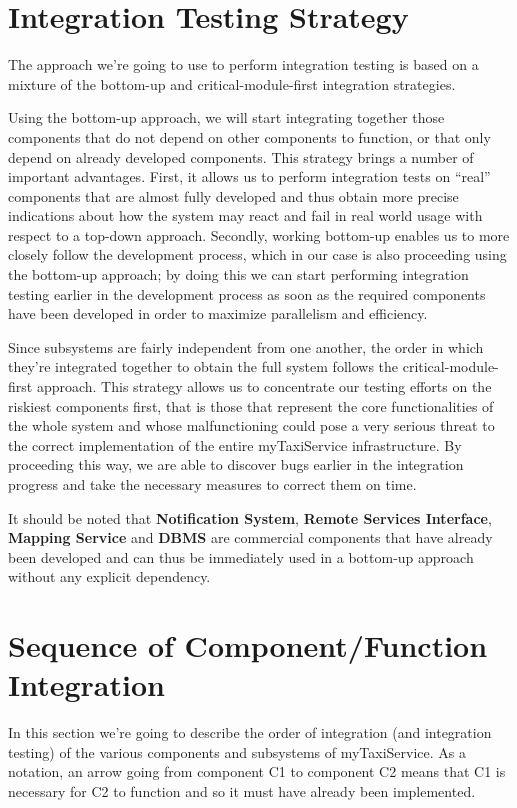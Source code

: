 \section{Integration Testing Strategy}
The approach we're going to use to perform integration testing is based on a mixture of the bottom-up and critical-module-first integration strategies.

Using the bottom-up approach, we will start integrating together those components that do not depend on other components to function, or that only depend on already developed components. This strategy brings a number of important advantages. First, it allows us to perform integration tests on “real” components that are almost fully developed and thus obtain more precise indications about how the system may react and fail in real world usage with respect to a top-down approach. Secondly, working bottom-up enables us to more closely follow the development process, which in our case is also proceeding using the bottom-up approach; by doing this we can start performing integration testing earlier in the development process as soon as the required components have been developed in order to maximize parallelism and efficiency.

Since subsystems are fairly independent from one another, the order in which they're integrated together to obtain the full system follows the critical-module-first approach. This strategy allows us to concentrate our testing efforts on the riskiest components first, that is those that represent the core functionalities of the whole system and whose malfunctioning could pose a very serious threat to the correct implementation of the entire myTaxiService infrastructure. By proceeding this way, we are able to discover bugs earlier in the integration progress and take the necessary measures to correct them on time.

It should be noted that \textbf{Notification System}, \textbf{Remote Services Interface}, \textbf{Mapping Service} and \textbf{DBMS} are commercial components that have already been developed and can thus be immediately used in a bottom-up approach without any explicit dependency. 
\section{Sequence of Component/Function Integration}
In this section we're going to describe the order of integration (and integration testing) of the various components and subsystems of myTaxiService. As a notation, an arrow going from component C1 to component C2 means that C1 is necessary for C2 to function and so it must have already been implemented. 
